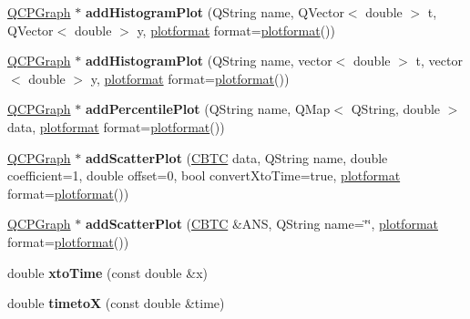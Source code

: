 \begin{DoxyCompactItemize}
\item 
\mbox{\label{classplot_window_af48fc09607698ae702a93cd39e99ef20}} 
\hyperlink{class_q_c_p_graph}{Q\+C\+P\+Graph} $\ast$ {\bfseries add\+Histogram\+Plot} (Q\+String name, Q\+Vector$<$ double $>$ t, Q\+Vector$<$ double $>$ y, \hyperlink{structplotformat}{plotformat} format=\hyperlink{structplotformat}{plotformat}())
\item 
\mbox{\label{classplot_window_a203fb0f974f9c632ee153e2d725dd3e3}} 
\hyperlink{class_q_c_p_graph}{Q\+C\+P\+Graph} $\ast$ {\bfseries add\+Histogram\+Plot} (Q\+String name, vector$<$ double $>$ t, vector$<$ double $>$ y, \hyperlink{structplotformat}{plotformat} format=\hyperlink{structplotformat}{plotformat}())
\item 
\mbox{\label{classplot_window_a35b2a8eaeae225944067341f78f5c47e}} 
\hyperlink{class_q_c_p_graph}{Q\+C\+P\+Graph} $\ast$ {\bfseries add\+Percentile\+Plot} (Q\+String name, Q\+Map$<$ Q\+String, double $>$ data, \hyperlink{structplotformat}{plotformat} format=\hyperlink{structplotformat}{plotformat}())
\item 
\mbox{\label{classplot_window_aece0fd514b3a0653faad1d0736156ae1}} 
\hyperlink{class_q_c_p_graph}{Q\+C\+P\+Graph} $\ast$ {\bfseries add\+Scatter\+Plot} (\hyperlink{class_c_b_t_c}{C\+B\+TC} data, Q\+String name, double coefficient=1, double offset=0, bool convert\+Xto\+Time=true, \hyperlink{structplotformat}{plotformat} format=\hyperlink{structplotformat}{plotformat}())
\item 
\mbox{\label{classplot_window_ae12910b35299ddcb32dfec58c31e00fe}} 
\hyperlink{class_q_c_p_graph}{Q\+C\+P\+Graph} $\ast$ {\bfseries add\+Scatter\+Plot} (\hyperlink{class_c_b_t_c}{C\+B\+TC} \&A\+NS, Q\+String name=\char`\"{}\char`\"{}, \hyperlink{structplotformat}{plotformat} format=\hyperlink{structplotformat}{plotformat}())
\item 
\mbox{\label{classplot_window_adcd3da3dcefc6d05e93c46c0ba260655}} 
double {\bfseries xto\+Time} (const double \&x)
\item 
\mbox{\label{classplot_window_a33456c0c494ada0065f885883ba4e135}} 
double {\bfseries timetoX} (const double \&time)

\end{DoxyCompactItemize}
